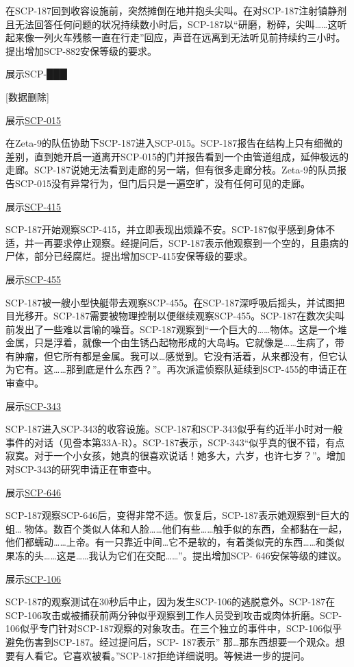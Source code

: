 在SCP-187回到收容设施前，突然摊倒在地并抱头尖叫。在对SCP-187注射镇静剂且无法回答任何问题的状况持续数小时后，SCP-187以“研磨，粉碎，尖叫……这听起来像一列火车残骸一直在行走”回应，声音在远离到无法听见前持续约三小时。提出增加SCP-882安保等级的要求。

\hr

展示SCP-███

{[}数据删除]

\hr

展示\hyperref[chap:SCP-015]{SCP-015}

在Zeta-9的队伍协助下SCP-187进入SCP-015。SCP-187报告在结构上只有细微的差别，直到她开启一道离开SCP-015的门并报告看到一个由管道组成，延伸极远的走廊。SCP-187说她无法看到走廊的另一端，但有很多走廊分枝。Zeta-9的队员报告SCP-015没有异常行为，但门后只是一遍空旷，没有任何可见的走廊。

\hr

展示\hyperref[chap:SCP-415]{SCP-415}

SCP-187开始观察SCP-415，并立即表现出烦躁不安。SCP-187似乎感到身体不适，并一再要求停止观察。经提问后，SCP-187表示他观察到一个空的，且患病的尸体，部分已经腐烂。提出增加SCP-415安保等级的要求。

\hr

展示\hyperref[chap:SCP-455]{SCP-455}

SCP-187被一艘小型快艇带去观察SCP-455。在SCP-187深呼吸后摇头，并试图把目光移开。SCP-187需要被物理控制以便继续观察SCP-455。SCP-187在数次尖叫前发出了一些难以言喻的噪音。SCP-187观察到“一个巨大的……物体。这是一个堆金属，只是浮着，就像一个由生锈凸起物形成的大岛屿。它就像是……生病了，带有肿瘤，但它所有都是金属。我可以…感觉到。它没有活着，从来都没有，但它认为它有。这……那到底是什么东西？”。再次派遣侦察队延续到SCP-455的申请正在审查中。

\hr

展示\hyperref[chap:SCP-343]{SCP-343}

SCP-187进入SCP-343的收容设施。SCP-187和SCP-343似乎有约近半小时对一般事件的对话（见誊本第33A-R）。SCP-187表示，SCP-343“似乎真的很不错，有点寂寞。对于一个小女孩，她真的很喜欢说话！她多大，六岁，也许七岁？”。增加对SCP-343的研究申请正在审查中。

\hr

展示\hyperref[chap:SCP-646]{SCP-646}

SCP-187观察SCP-646后，变得非常不适。恢复后，SCP-187表示她观察到“巨大的蛆… 物体。数百个类似人体和人脸……他们有些……触手似的东西，全都黏在一起，他们都蠕动……上帝。有一只靠近中间…它不是软的，有着类似壳的东西……和类似果冻的头……这是……我认为它们在交配……”。提出增加SCP- 646安保等级的建议。

\hr

展示\hyperref[chap:SCP-106]{SCP-106}

SCP-187的观察测试在30秒后中止，因为发生SCP-106的逃脱意外。SCP-187在SCP-106攻击或被捕获前两分钟似乎观察到工作人员受到攻击或肉体折磨。SCP-106似乎专门针对SCP-187观察的对象攻击。在三个独立的事件中，SCP-106似乎避免伤害到SCP-187。经过提问后，SCP- 187表示” 那…那东西想要一个观众。想要有人看它。它喜欢被看。”SCP-187拒绝详细说明。等候进一步的提问。
